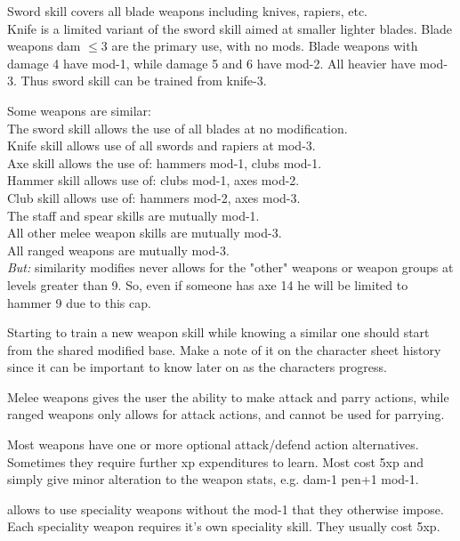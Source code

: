 Sword skill covers all blade weapons including knives, rapiers, etc. \\
Knife is a limited variant of the sword skill aimed at smaller lighter blades. Blade weapons dam $\leq$3 are the primary use, with no mods. Blade weapons with damage 4 have mod-1, while damage 5 and 6 have mod-2. All heavier have mod-3. Thus sword skill can be trained from knife-3.

Some weapons are similar:\\
The sword skill allows the use of all blades at no modification.\\
Knife skill allows use of all swords and rapiers at mod-3.\\
Axe skill allows the use of: hammers mod-1, clubs mod-1.\\
Hammer skill allows use of: clubs mod-1, axes mod-2.\\
Club skill allows use of: hammers mod-2, axes mod-3.\\
The staff and spear skills are mutually mod-1.\\
All other melee weapon skills are mutually mod-3.\\
All ranged weapons are mutually mod-3.\\
\emph{But:} similarity modifies never allows for the "other" weapons or weapon groups at levels greater than 9. So, even if someone has axe 14 he will be limited to hammer 9 due to this cap.


Starting to train a new weapon skill while knowing a similar one should start from the shared modified base. Make a note of it on the character sheet history since it can be important to know later on as the characters progress.

Melee weapons gives the user the ability to make attack and parry actions, while ranged weapons only allows for attack actions, and cannot be used for parrying.

Most weapons have one or more optional attack/defend action alternatives. Sometimes they require further xp expenditures to learn. Most cost 5xp and simply give minor alteration to the weapon stats, e.g. dam-1 pen+1 mod-1.


 allows to use speciality weapons without the mod-1 that they otherwise impose. Each speciality weapon requires it's own speciality skill. They usually cost 5xp.


